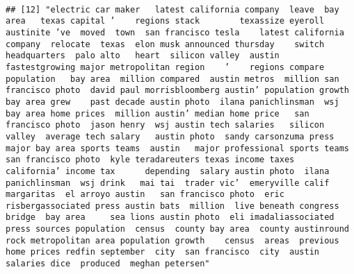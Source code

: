 \documentclass[
]{article}
\begin{document}
\begin{verbatim}
                                                                                                                                                                                                                                                                                                                                                                                                                                                                   
## [12] "electric car maker   latest california company  leave  bay area   texas capital ’    regions stack        texassize eyeroll   austinite ’ve  moved  town  san francisco tesla    latest california company  relocate  texas  elon musk announced thursday    switch  headquarters  palo alto   heart  silicon valley  austin  fastestgrowing major metropolitan region    ’    regions compare population   bay area  million compared  austin metros  million san francisco photo  david paul morrisbloomberg austin’ population growth   bay area grew    past decade austin photo  ilana panichlinsman  wsj bay area home prices  million austin’ median home price   san francisco photo  jason henry  wsj austin tech salaries   silicon valley  average tech salary   austin photo  sandy carsonzuma press major bay area sports teams  austin   major professional sports teams san francisco photo  kyle teradareuters texas income taxes  california’ income tax      depending  salary austin photo  ilana panichlinsman  wsj drink   mai tai  trader vic’  emeryville calif margaritas  el arroyo austin   san francisco photo  eric risbergassociated press austin bats  million  live beneath congress bridge  bay area     sea lions austin photo  eli imadaliassociated press sources population  census  county bay area  county austinround rock metropolitan area population growth    census  areas  previous home prices redfin september  city  san francisco  city  austin salaries dice  produced  meghan petersen"                                                                                                                                                                                                                                                                                                                                                                                                                                                                                                                                                                                                                                                                                                                                                                                                                                                                                                                                                                                                                                                                                                                                                                                                                                                                                                                                                                                                                                
\end{verbatim}
\end{document}
